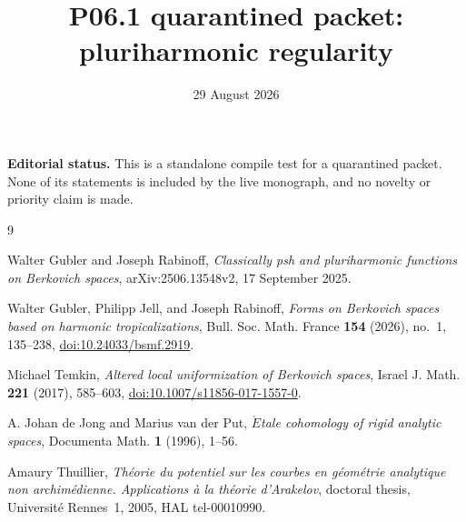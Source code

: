 \documentclass[11pt]{article}
\title{P06.1 quarantined packet: pluriharmonic regularity}
\author{}
\date{29 August 2026}
\begin{document}
\maketitle

\noindent
\textbf{Editorial status.}
This is a standalone compile test for a quarantined packet.  None of its
statements is included by the live monograph, and no novelty or priority
claim is made.




\begin{thebibliography}{9}

Walter Gubler and Joseph Rabinoff,
\emph{Classically psh and pluriharmonic functions on Berkovich spaces},
arXiv:2506.13548v2, 17 September 2025.

Walter Gubler, Philipp Jell, and Joseph Rabinoff,
\emph{Forms on Berkovich spaces based on harmonic tropicalizations},
Bull. Soc. Math. France \textbf{154} (2026), no.~1, 135--238,
\href{https://doi.org/10.24033/bsmf.2919}{doi:10.24033/bsmf.2919}.

Michael Temkin,
\emph{Altered local uniformization of Berkovich spaces},
Israel J. Math. \textbf{221} (2017), 585--603,
\href{https://doi.org/10.1007/s11856-017-1557-0}%
{doi:10.1007/s11856-017-1557-0}.

A. Johan de Jong and Marius van der Put,
\emph{\(\acute{E}\)tale cohomology of rigid analytic spaces},
Documenta Math. \textbf{1} (1996), 1--56.

Amaury Thuillier,
\emph{Th\'eorie du potentiel sur les courbes en g\'eom\'etrie analytique
non archim\'edienne. Applications \`a la th\'eorie d'Arakelov},
doctoral thesis, Universit\'e Rennes~1, 2005, HAL tel-00010990.

\end{thebibliography}
\end{document}
